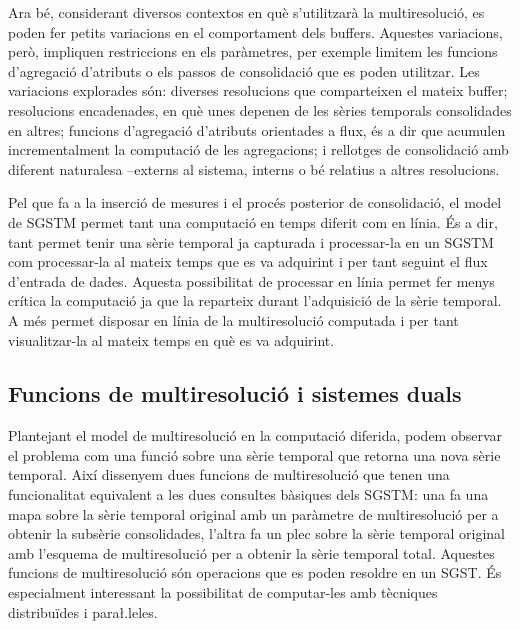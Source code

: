 Ara bé, considerant diversos contextos en què s'utilitzarà la
multiresolució, es poden fer petits variacions en el comportament dels
buffers. Aquestes variacions, però, impliquen restriccions en els
paràmetres, per exemple limitem les funcions d'agregació d'atributs o
els passos de consolidació que es poden utilitzar.  Les variacions
explorades són: diverses resolucions que comparteixen el mateix
buffer; resolucions encadenades, en què unes depenen de les sèries
temporals consolidades en altres; funcions d'agregació d'atributs
orientades a flux, és a dir que acumulen incrementalment la computació
de les agregacions; i rellotges de consolidació amb diferent
naturalesa --externs al sistema, interns o bé relatius a altres
resolucions.




Pel que fa a la inserció de mesures i el procés posterior de
consolidació, el model de \gls{SGSTM} permet tant una computació en
temps diferit com en línia. És a dir, tant permet tenir una sèrie
temporal ja capturada i processar-la en un \gls{SGSTM} com
processar-la al mateix temps que es va adquirint i per tant seguint el
flux d'entrada de dades.  Aquesta possibilitat de processar en línia
permet fer menys crítica la computació ja que la reparteix durant
l'adquisició de la sèrie temporal. A més permet disposar en línia de
la multiresolució computada i per tant visualitzar-la al mateix temps
en què es va adquirint.






\subsection{Funcions de multiresolució i sistemes duals}





Plantejant el model de multiresolució en la computació diferida, podem
observar el problema com una funció sobre una sèrie temporal que
retorna una nova sèrie temporal. Així dissenyem dues funcions de
multiresolució que tenen una funcionalitat equivalent a les dues
consultes bàsiques dels \gls{SGSTM}: una fa una mapa sobre la sèrie
temporal original amb un paràmetre de multiresolució per a obtenir la
subsèrie consolidades, l'altra fa un plec sobre la sèrie temporal
original amb l'esquema de multiresolució per a obtenir la sèrie
temporal total.  Aquestes funcions de multiresolució són operacions
que es poden resoldre en un \gls{SGST}. És especialment interessant la
possibilitat de computar-les amb tècniques distribuïdes i
para\l.leles.





